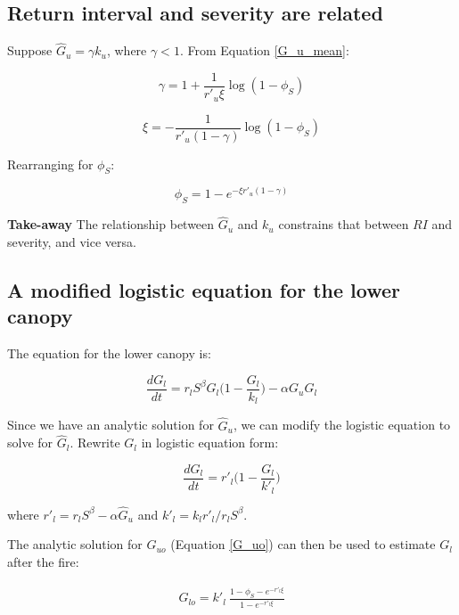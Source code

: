 \documentclass[12pt]{article}
\begin{document}
\subsection*{Return interval and severity are related}

Suppose $\hat G_u = \gamma k_u$, where $\gamma<1$. From  Equation \ref{G_u_mean}:

\begin{equation}
\gamma =  1 + \frac{1}{r'_u \xi} \log(1-\phi_S) 
\end{equation}

\begin{equation}
\xi = -\frac{1}{r'_u (1-\gamma) }\log(1-\phi_S)
\end{equation}

Rearranging for $\phi_S$: 

\begin{equation}
\phi_S = 1- e^{-\xi r'_u (1-\gamma)}
\end{equation}

\textbf{Take-away}
 The relationship between $\hat G_u$ and $k_u$ constrains that between $RI$ and severity, and vice versa.


\subsection*{A modified logistic equation for the lower canopy}

The equation for the lower canopy  is:

 \begin{equation}
    \frac{d G_l}{dt} = r_l S^\beta G_l \bigg(1-\frac{G_l}{k_l}\bigg) - \alpha G_u G_l
\end{equation}

Since we have an analytic solution for $\hat G_u$,  we can modify the logistic equation to solve for $\hat G_l$.
Rewrite $G_l$  in logistic equation form:

  \begin{equation}
    \frac{d G_l}{dt} = r'_l \bigg(1-\frac{G_l}{k'_l}\bigg)
\end{equation}

where $r'_l = r_l S^\beta - \alpha \hat G_u$ and $k'_l  = k_l r'_l / r_l S^\beta$.

The analytic solution for $G_{uo}$ (Equation \ref{G_uo}) can then be used to estimate $G_l$ after the fire:

\begin{eqnarray}
  G_{lo} =  k'_l \   \frac{1- \phi_S - e^{-r'_l \xi} }{1 - e^{-r'_l \xi}}
\end{eqnarray}
\end{document}
